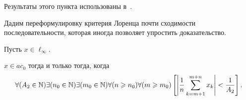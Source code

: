 Результаты этого пункта использованы в~\cite{our-mz2019ac0}.

Дадим переформулировку критерия Лоренца
\cite{lorentz1948contribution,bennett1974consistency}
почти сходимости последовательности,
которая иногда позволяет упростить доказательство.


\begin{theorem}
	\label{thm:Lorentz_mod}
	Пусть $x\in\ell_\infty$.

	$x\in ac_0$ тогда и только тогда, когда
	\begin{equation}\label{crit_pos_ac0}
		\forall(A_2\in\N)
		\exists(n_0\in\N)
		\exists(m_0\in\N)
		\forall(n\geq n_0)
		\forall(m\geq m_0)
		\\
		\left[
			\left|
			\frac{1}{n}
			\sum_{k=m+1}^{m+n} x_k
			\right|
			<
			\frac{1}{A_2}
		\right]
		.
	\end{equation}

\end{theorem}

